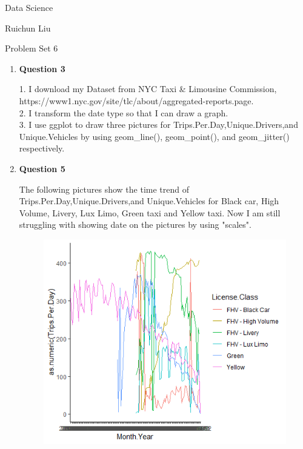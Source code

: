 \documentclass[11pt,a4paper]{article}
\begin{document}
	\begin{center}
		Data Science
		
		Ruichun Liu
		
		Problem Set 6
	\end{center}
\begin{enumerate}



    \item \textbf{Question 3}
		  \begin{description}
	            1. I download my Dataset from NYC Taxi & Limousine Commission,\\https://www1.nyc.gov/site/tlc/about/aggregated-reports.page.\\
	            2. I transform the date type so that I can draw a graph.\\
	            3. I use ggplot to draw three pictures for Trips.Per.Day,Unique.Drivers,and Unique.Vehicles by using geom\_line(), geom\_point(), and geom\_jitter() respectively.
          \end{description}
          
    \item \textbf{Question 5}
		  \begin{description}
		  The following pictures show the time trend of Trips.Per.Day,Unique.Drivers,and Unique.Vehicles for Black car, High Volume, Livery, Lux Limo, Green taxi and Yellow taxi. Now I am still struggling with showing date on the pictures by using "scales".
             \begin{figure}[h]
                 \centering
                 \includegraphics[width=14cm]{PS6a_LIU.png}
              \end{figure}
              

\end{description}
\end{enumerate}
\end{document}
